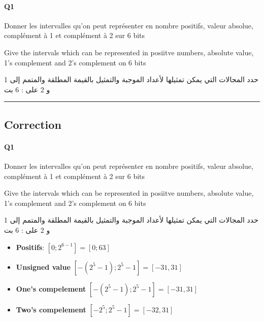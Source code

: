 \pagebreak

\paragraph{Q1}


Donner les intervalles qu'on peut représenter en nombre positifs, valeur absolue, complément à 1 et complément à 2  sur 6 bits


Give the intervals which can be represented in posiitve numbers, absolute value, 1's complement and 2's complement on 6 bits

\begin{arab}[utf]
حدد المجالات التي يمكن تمثيلها لأعداد الموجبة والتمثيل بالقيمة المطلقة والمتمم إلى 1 و 2 على   : 6 بت
\end{arab}




\hrule width 1\linewidth
\pagebreak

\subsection{Correction}


\paragraph{Q1}


Donner les intervalles qu'on peut représenter en nombre positifs, valeur absolue, complément à 1 et complément à 2  sur 6 bits


Give the intervals which can be represented in posiitve numbers, absolute value, 1's complement and 2's complement on 6 bits

\begin{arab}[utf]
حدد المجالات التي يمكن تمثيلها لأعداد الموجبة والتمثيل بالقيمة المطلقة والمتمم إلى 1 و 2 على   : 6 بت
\end{arab}


\begin{itemize}
\item \textbf{Positifs}: $[0; 2^{ 6-1 }] = [0; 63]$
\item \textbf{Unsigned value} $[-(2^{ 5 }-1 );2^{ 5 }-1] = [-31, 31]$
\item \textbf{One's compelement} $[-(2^{ 5 }-1 );2^{ 5 }-1] = [-31, 31]$
\item \textbf{Two's compelement} $[-2^{ 5 } ;2^{ 5 }-1] = [-32, 31]$
\end{itemize}

\pagebreak

